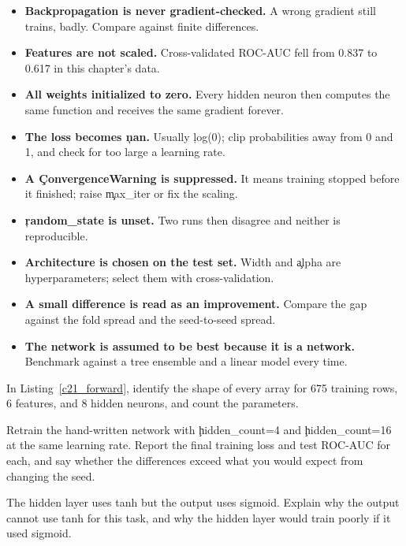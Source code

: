 \begin{itemize}
    \item \textbf{Backpropagation is never gradient-checked.} A wrong gradient
          still trains, badly. Compare against finite differences.
    \item \textbf{Features are not scaled.} Cross-validated ROC-AUC fell from
          0.837 to 0.617 in this chapter's data.
    \item \textbf{All weights initialized to zero.} Every hidden neuron then
          computes the same function and receives the same gradient forever.
    \item \textbf{The loss becomes \c{nan}.} Usually \c{log(0)}; clip
          probabilities away from 0 and 1, and check for too large a learning
          rate.
    \item \textbf{A \c{ConvergenceWarning} is suppressed.} It means training
          stopped before it finished; raise \c{max_iter} or fix the scaling.
    \item \textbf{\c{random_state} is unset.} Two runs then disagree and neither
          is reproducible.
    \item \textbf{Architecture is chosen on the test set.} Width and \c{alpha}
          are hyperparameters; select them with cross-validation.
    \item \textbf{A small difference is read as an improvement.} Compare the gap
          against the fold spread and the seed-to-seed spread.
    \item \textbf{The network is assumed to be best because it is a network.}
          Benchmark against a tree ensemble and a linear model every time.
\end{itemize}



In Listing~\ref{c21_forward}, identify the shape of every array for 675 training
rows, 6 features, and 8 hidden neurons, and count the parameters.


Retrain the hand-written network with \c{hidden_count=4} and \c{hidden_count=16}
at the same learning rate. Report the final training loss and test ROC-AUC for
each, and say whether the differences exceed what you would expect from changing
the seed.


The hidden layer uses tanh but the output uses sigmoid. Explain why the output
cannot use tanh for this task, and why the hidden layer would train poorly if it
used sigmoid.

